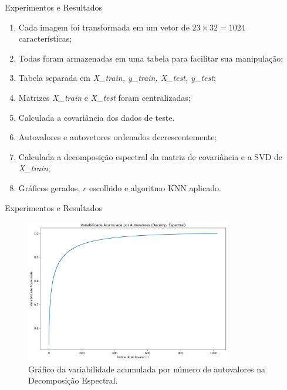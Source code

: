 \documentclass{beamer}
\theoremstyle{definition}
\begin{document}
\begin{frame}{Experimentos e Resultados}
    \begin{enumerate}
        \item Cada imagem foi transformada em um vetor de $23 \times 32 = 1024$ características;
        \pause
        \item Todas foram armazenadas em uma tabela para facilitar sua manipulação;
        \pause
        \item Tabela separada em \textit{X\_train, y\_train, X\_test, y\_test};
        \pause
        \item Matrizes \textit{X\_train} e \textit{X\_test} foram centralizadas;
        \pause
        \item Calculada a covariância dos dados de teste.
        \item Autovalores e autovetores ordenados decrescentemente;
        \pause
        \item Calculada a decomposição espectral da matriz de covariância e a SVD de \textit{X\_train};
        \pause
        \item Gráficos gerados, $r$ escolhido e algoritmo KNN aplicado.
    \end{enumerate}
\end{frame}

\begin{frame}{Experimentos e Resultados}
\begin{figure}[H]
  \centering
    \caption{Gráfico da variabilidade acumulada por número de autovalores na Decomposição Espectral.}
    \includegraphics[width=9cm]{var_acu_espectral}
\end{figure}
\end{frame}
\end{document}
